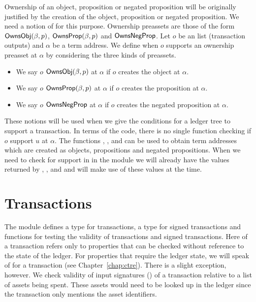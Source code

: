 Ownership of an object, proposition or negated proposition will be originally
justified by the creation of the object, proposition or negated proposition.
We need a notion of {} for this purpose.
Ownership preassets
are those of the form
${\constr{OwnsObj}}(\beta,p)$,
${\constr{OwnsProp}}(\beta,p)$
and
${\constr{OwnsNegProp}}$.
Let $o$ be an {} list (transaction outputs)
and $\alpha$ be a term address.
We define when $o$ supports an ownership preasset at $\alpha$
by considering the three kinds of preassets.
\begin{itemize}
\item We say $o$ {} ${\constr{OwnsObj}}(\beta,p)$ at $\alpha$
      if $o$ creates the object at $\alpha$.
\item We say $o$ {} ${\constr{OwnsProp}}(\beta,p)$ at $\alpha$
      if $o$ creates the proposition at $\alpha$.
\item We say $o$ {} ${\constr{OwnsNegProp}}$ at $\alpha$
      if $o$ creates the negated proposition at $\alpha$.
\end{itemize}

These notions will be used when we give the conditions
for a ledger tree to support a transaction.
In terms of the code, there is no single function checking if $o$ support $u$ at $\alpha$.
The functions
{},
{},
and
{}
can be used to obtain term addresses which are created as objects, propositions
and negated propositions.
When we need to check for support in {}
in the module {}
we will already have the values returned by
{},
{},
and
{}
and will make use of these values at the time.

\section{Transactions}

The module  defines a type {} for transactions,
a type {} for signed transactions
and functions for testing the validity of transactions and signed transactions.
Here {} of a transaction refers only to properties that
can be checked without reference to the state of the ledger.
For properties that require the ledger state, we will speak of {}
for a transaction (see Chapter~\ref{chap:ctre}).
There is a slight exception, however. We check validity of input signatures 
({}) of
a transaction relative to a list of assets being spent.
These assets would need to be looked up in the ledger
since the transaction only mentions the asset identifiers.

